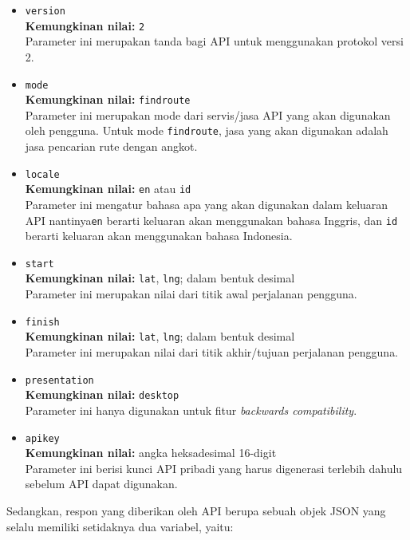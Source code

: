 \begin{itemize}
	\item \verb|version|\\
	\textbf{Kemungkinan nilai:} \verb|2|\\
	Parameter ini merupakan tanda bagi API untuk menggunakan protokol versi 2.
	\item \verb|mode|\\
	\textbf{Kemungkinan nilai:} \verb|findroute|\\
	Parameter ini merupakan mode dari servis/jasa API yang akan digunakan oleh pengguna. Untuk mode \verb|findroute|, jasa yang akan digunakan adalah jasa pencarian rute dengan angkot.
	\item \verb|locale|\\
	\textbf{Kemungkinan nilai:} \verb|en| atau \verb|id|\\
	Parameter ini mengatur bahasa apa yang akan digunakan dalam keluaran API nantinya\textemdash\verb|en| berarti keluaran akan menggunakan bahasa Inggris, dan \verb|id| berarti keluaran akan menggunakan bahasa Indonesia.
	\item \verb|start|\\
	\textbf{Kemungkinan nilai:} \verb|lat|, \verb|lng|; dalam bentuk desimal\\
	Parameter ini merupakan nilai \latlon dari titik awal perjalanan pengguna.
	\item \verb|finish|\\
	\textbf{Kemungkinan nilai:} \verb|lat|, \verb|lng|; dalam bentuk desimal\\
	Parameter ini merupakan nilai \latlon dari titik akhir/tujuan perjalanan pengguna.
	\item \verb|presentation|\\
	\textbf{Kemungkinan nilai:} \verb|desktop|\\
	Parameter ini hanya digunakan untuk fitur \textit{backwards compatibility}.
	\item \verb|apikey|\\
	\textbf{Kemungkinan nilai:} angka heksadesimal 16-digit\\
	Parameter ini berisi kunci API pribadi yang harus digenerasi terlebih dahulu sebelum API dapat digunakan.
\end{itemize}

Sedangkan, respon yang diberikan oleh API berupa sebuah objek JSON yang selalu memiliki setidaknya dua variabel, yaitu:

